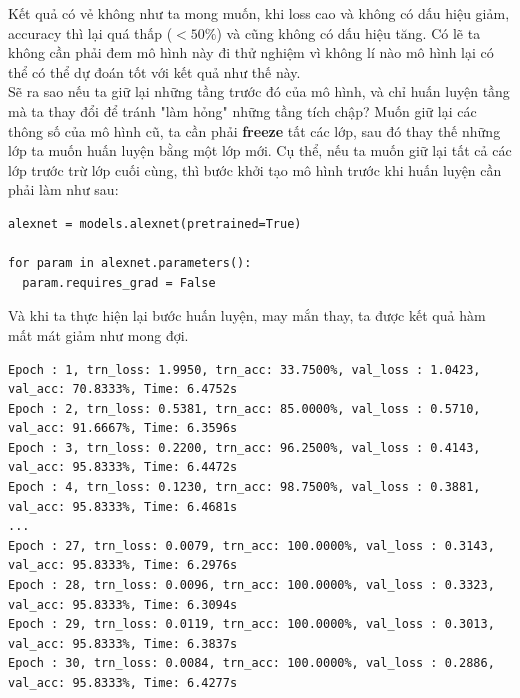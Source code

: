 \documentclass[a4paper]{article}
\begin{document}
Kết quả có vẻ không như ta mong muốn, khi loss cao và không có dấu hiệu giảm, accuracy thì lại quá thấp ($< 50\%$) và cũng không có dấu hiệu tăng. Có lẽ ta không cần phải đem mô hình này đi thử nghiệm vì không lí nào mô hình lại có thể có thể dự đoán tốt với kết quả như thế này.\\
Sẽ ra sao nếu ta giữ lại những tầng trước đó của mô hình, và chỉ huấn luyện tầng mà ta thay đổi để tránh "làm hỏng" những tầng tích chập? Muốn giữ lại các thông số của mô hình cũ, ta cần phải \textbf{freeze} tất các lớp, sau đó thay thế những lớp ta muốn huấn luyện bằng một lớp mới. Cụ thể, nếu ta muốn giữ lại tất cả các lớp trước trừ lớp cuối cùng, thì bước khởi tạo mô hình trước khi huấn luyện cần phải làm như sau:
\begin{lstlisting}
alexnet = models.alexnet(pretrained=True)

for param in alexnet.parameters():
  param.requires_grad = False
\end{lstlisting}
Và khi ta thực hiện lại bước huấn luyện, may mắn thay, ta được kết quả hàm mất mát giảm như mong đợi.
\begin{verbatim}
Epoch : 1, trn_loss: 1.9950, trn_acc: 33.7500%, val_loss : 1.0423, val_acc: 70.8333%, Time: 6.4752s
Epoch : 2, trn_loss: 0.5381, trn_acc: 85.0000%, val_loss : 0.5710, val_acc: 91.6667%, Time: 6.3596s
Epoch : 3, trn_loss: 0.2200, trn_acc: 96.2500%, val_loss : 0.4143, val_acc: 95.8333%, Time: 6.4472s
Epoch : 4, trn_loss: 0.1230, trn_acc: 98.7500%, val_loss : 0.3881, val_acc: 95.8333%, Time: 6.4681s
...
Epoch : 27, trn_loss: 0.0079, trn_acc: 100.0000%, val_loss : 0.3143, val_acc: 95.8333%, Time: 6.2976s
Epoch : 28, trn_loss: 0.0096, trn_acc: 100.0000%, val_loss : 0.3323, val_acc: 95.8333%, Time: 6.3094s
Epoch : 29, trn_loss: 0.0119, trn_acc: 100.0000%, val_loss : 0.3013, val_acc: 95.8333%, Time: 6.3837s
Epoch : 30, trn_loss: 0.0084, trn_acc: 100.0000%, val_loss : 0.2886, val_acc: 95.8333%, Time: 6.4277s
\end{verbatim}
\end{document}

